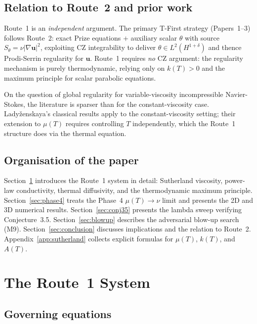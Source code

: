 \documentclass[12pt]{article}
\newcommand{\abs}[1]{\left|#1\right|}
\newcommand{\grad}{\nabla}
\begin{document}
\subsection{Relation to Route~2 and prior work}
\label{ssec:relation}

Route~1 is an \emph{independent} argument.  The primary T-First strategy (Papers~1--3)
follows Route~2: exact Prize equations $+$ auxiliary scalar $\theta$ with source
$S_\theta = \nu\abs{\grad\mathbf{u}}^2$, exploiting CZ integrability to deliver
$\theta \in L^2(H^{1+\delta})$ and thence Prodi-Serrin regularity for $\mathbf{u}$.
Route~1 requires \emph{no} CZ argument: the regularity mechanism is purely
thermodynamic, relying only on $k(T) > 0$ and the maximum principle for scalar
parabolic equations.

On the question of global regularity for variable-viscosity incompressible
Navier-Stokes, the literature is sparser than for the constant-viscosity case.
Lady\v{z}enskaya's classical results \citep{Prodi1959, Serrin1962} apply to the
constant-viscosity setting; their extension to $\mu(T)$ requires controlling $T$
independently, which the Route~1 structure does via the thermal equation.

\subsection{Organisation of the paper}
\label{ssec:organisation}

Section~\ref{sec:system} introduces the Route~1 system in detail: Sutherland
viscosity, power-law conductivity, thermal diffusivity, and the thermodynamic
maximum principle.  Section~\ref{sec:phase4} treats the Phase~4 $\mu(T)\to\nu$
limit and presents the 2D and 3D numerical results.
Section~\ref{sec:conj35} presents the lambda sweep verifying Conjecture~3.5.
Section~\ref{sec:blowup} describes the adversarial blow-up search (M9).
Section~\ref{sec:conclusion} discusses implications and the relation to Route~2.
Appendix~\ref{app:sutherland} collects explicit formulas for $\mu(T)$, $k(T)$,
and $A(T)$.

\section{The Route~1 System}
\label{sec:system}

\subsection{Governing equations}
\label{ssec:gov-eqs}
\end{document}
